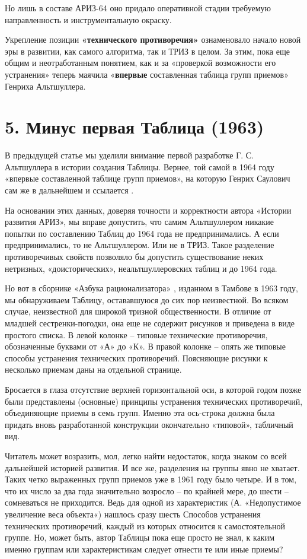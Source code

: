 \documentclass[11pt,a4paper]{article}
\begin{document}
Но лишь в составе АРИЗ-64 оно придало оперативной стадии требуемую
направленность и инструментальную окраску.

Укрепление позиции \textbf{«технического противоречия»} ознаменовало начало
новой эры в развитии, как самого алгоритма, так и ТРИЗ в целом. За этим, пока
еще общим и неотработанным понятием, как и за «проверкой возможности его
устранения» теперь маячила «\textbf{впервые} составленная таблица групп
приемов» Генриха Альтшуллера.

\clearpage
\section*{5. Минус первая Таблица (1963)}

В предыдущей статье мы уделили внимание первой разработке Г. С. Альтшуллера в
истории создания Таблицы. Вернее, той самой в 1964 году «впервые составленной
таблице групп приемов», на которую Генрих Саулович сам же в дальнейшем и
ссылается \cite{Altshuller1986a}.

На основании этих данных, доверяя точности и корректности автора «Истории
развития АРИЗ», мы вправе допустить, что самим Альтшуллером никакие попытки по
составлению Таблиц до 1964 года не предпринимались. А если предпринимались, то
не Альтшуллером. Или не в ТРИЗ. Такое разделение противоречивых свойств
позволяло бы допустить существование неких нетризных, «доисторических»,
неальтшуллеровских таблиц и до 1964 года.

Но вот в сборнике «Азбука рационализатора» \cite[С. 274--304]{Altshuller1963},
изданном в Тамбове в 1963 году, мы обнаруживаем Таблицу, остававшуюся до сих
пор неизвестной. Во всяком случае, неизвестной для широкой тризной
общественности. В отличие от младшей сестренки-погодки, она еще не содержит
рисунков и приведена в виде простого списка. В левой колонке -- типовые
технические противоречия, обозначенные буквами от «А» до «К». В правой колонке
-- опять же типовые способы устранения технических противоречий. Поясняющие
рисунки к несколько приемам даны на отдельной странице.

Бросается в глаза отсутствие верхней горизонтальной оси, в которой годом позже
были представлены (основные) принципы устранения технических противоречий,
объединяющие приемы в семь групп. Именно эта ось-строка должна была придать
вновь разработанной конструкции окончательно «типовой», табличный вид.

Читатель может возразить, мол, легко найти недостаток, когда знаком со всей
дальнейшей историей развития. И все же, разделения на группы явно не хватает.
Таких четко выраженных групп приемов уже в 1961 году было четыре. И в том, что
их число за два года значительно возросло -- по крайней мере, до шести --
сомневаться не приходится. Ведь для одной из характеристик (А. «Недопустимое
увеличение веса объекта«) нашлось сразу шесть Способов устранения технических
противоречий, каждый из которых относится к самостоятельной группе. Но, может
быть, автор Таблицы пока еще просто не знал, к каким именно группам или
характеристикам следует отнести те или иные приемы?
\end{document}
